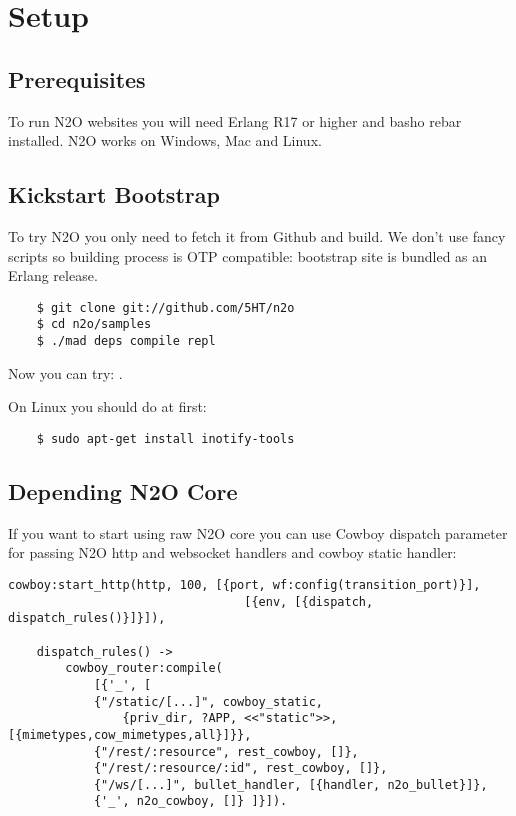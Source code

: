 \section{Setup}

\subsection{Prerequisites}
To run N2O websites you will need Erlang R17 or higher and basho rebar installed.
N2O works on Windows, Mac and Linux.

\subsection{Kickstart Bootstrap}
To try N2O you only need to fetch it from Github and build. We don't use
fancy scripts so building process is OTP compatible: bootstrap site
is bundled as an Erlang release.

\vspace{1\baselineskip}
\begin{lstlisting}
    $ git clone git://github.com/5HT/n2o
    $ cd n2o/samples
    $ ./mad deps compile repl
\end{lstlisting}
\vspace{1\baselineskip}

Now you can try: .

On Linux you should do at first:

\begin{lstlisting}
    $ sudo apt-get install inotify-tools
\end{lstlisting}

\newpage
\subsection{Depending N2O Core}
If you want to start using raw N2O core you can use Cowboy dispatch parameter
for passing N2O http and websocket handlers and cowboy static handler:

\begin{lstlisting}[caption=web\_sup.erl]
    cowboy:start_http(http, 100, [{port, wf:config(transition_port)}],
                                 [{env, [{dispatch, dispatch_rules()}]}]),

    dispatch_rules() ->
        cowboy_router:compile(
            [{'_', [
            {"/static/[...]", cowboy_static,
                {priv_dir, ?APP, <<"static">>,[{mimetypes,cow_mimetypes,all}]}},
            {"/rest/:resource", rest_cowboy, []},
            {"/rest/:resource/:id", rest_cowboy, []},
            {"/ws/[...]", bullet_handler, [{handler, n2o_bullet}]},
            {'_', n2o_cowboy, []} ]}]).
\end{lstlisting}

